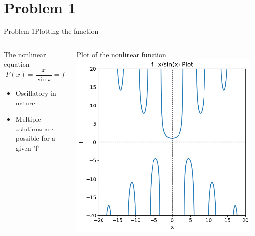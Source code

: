 \documentclass{beamer}
\begin{document}
\section{Problem 1}

\begin{frame}{Problem 1}{Plotting the function}
    \vspace{-3em}
    \begin{columns}
        \begin{block}{\footnotesize The nonlinear equation}
            \footnotesize
            \[F(x)=\frac{x}{\sin x}=f\]
            \begin{itemize}
                \item Oscillatory in nature
                \item Multiple solutions are possible for a given 'f'
            \end{itemize}
        \end{block}
        \begin{block}{\footnotesize Plot of the nonlinear function}
            \includegraphics[width=\textwidth]{Figures/prob1_functionplot.png}
        \end{block}
    \end{columns}
\end{frame}
\end{document}
